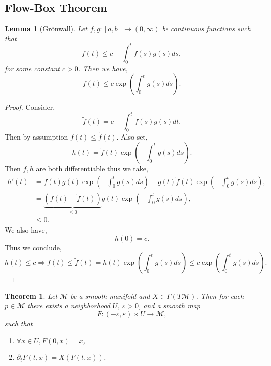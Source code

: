 \documentclass[8pt]{article}
\newtheorem{theorem}{Theorem} [section]
\newtheorem{lemma}{Lemma}[section]
\newcommand{\M}[0]{\mathcal{M}}
\begin{document}
\subsection{Flow-Box Theorem}
\begin{lemma}[Grönwall]
  \label{gronwall_lemma}
  Let $f,g:[a,b]\to(0,\infty)$ be continuous functions such that 
  \begin{equation*}
    f(t)\leq c+\int_0^t f(s)g(s)ds,
  \end{equation*}
  for some constant $c>0$. Then we have,
  \begin{equation*}
    f(t)\leq c\exp\left(\int_0^tg(s)ds\right).
  \end{equation*}
\end{lemma}
\begin{proof}
  Consider,
  \begin{equation*}
    \tilde{f}(t) = c+\int_0^t f(s)g(s)dt.
  \end{equation*}
  Then by assumption $f(t)\leq \tilde{f}(t)$. Also set,
  \begin{equation*}
    h(t) = \tilde{f}(t)\exp\left(-\int_0^t g(s)ds\right).
  \end{equation*}
  Then $f,h$ are both differentiable thus we take,
  \begin{align*}
    h'(t) &= f(t)g(t)\exp\left(-\int_0^t g(s)ds\right)-g(t)\tilde{f}(t)\exp\left(-\int_0^t g(s)ds\right),\\
    &= \underbrace{(f(t)-\tilde{f}(t))}_{\leq 0}g(t)\exp\left(-\int_0^t g(s)ds\right),\\
    &\leq 0.
  \end{align*}
  We also have,
  \begin{equation*}
    h(0) = c.
  \end{equation*}
  Thus we conclude,
  \begin{equation*}
    h(t)\leq c\Rightarrow f(t)\leq \tilde{f}(t)=h(t)\exp\left(\int_0^t g(s)ds\right)\leq c\exp\left(\int_0^t g(s)ds\right).
  \end{equation*}
\end{proof}
\begin{theorem}
  \label{theorem_flow_box}
  Let $\M$ be a smooth manifold and $X\in\Gamma(T\M)$. Then for each $p\in\M$ there exists a neighborhood $U$, $\varepsilon>0$, and a smooth map 
  \begin{equation*}
    F:(-\varepsilon,\varepsilon)\times U\to\M,
  \end{equation*}
  such that 
  \begin{enumerate}[1).]
    \item $\forall x\in U, F(0,x)=x$,
    \item $\partial_tF(t,x) = X(F(t,x))$.
  \end{enumerate}
\end{theorem}
\end{document}
